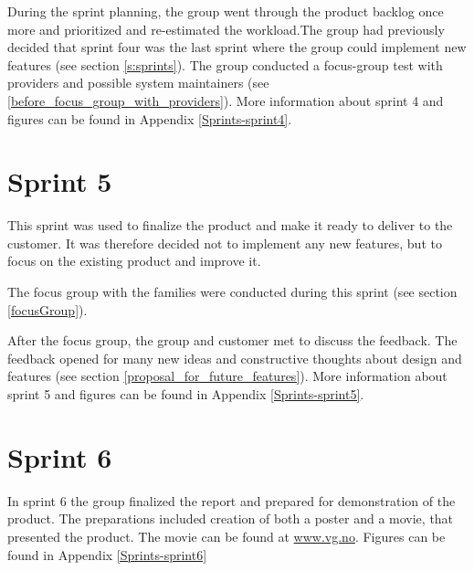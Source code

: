 During the sprint planning, the group went through the product backlog once more and prioritized and re-estimated the workload.The group had previously decided that sprint four was the last sprint where the group could implement new features (see section \ref{s:sprints}). The group conducted a focus-group test with providers and possible system maintainers (see \ref{before_focus_group_with_providers}). More information about sprint 4 and figures can be found in Appendix \ref{Sprints-sprint4}.


\section{Sprint 5}
\label{sprint5}
This sprint was used to finalize the product and make it ready to deliver to the customer. It was therefore decided not to implement any new features, but to focus on the existing product and improve it. 

The focus group with the families were conducted during this sprint (see section \ref{focusGroup}). 

After the focus group, the group and customer met to discuss the feedback. The feedback opened for many new ideas and constructive thoughts about design and features (see section \ref{proposal_for_future_features}). More information about sprint 5 and figures can be found in Appendix \ref{Sprints-sprint5}.


\section{Sprint 6}
\label{sprint6}

In sprint 6 the group finalized the report and prepared for demonstration of the product. The preparations included creation of both a poster and a movie, that presented the product. The movie can be found at \url{www.vg.no}.
Figures can be found in Appendix \ref{Sprints-sprint6}

\cleardoublepage